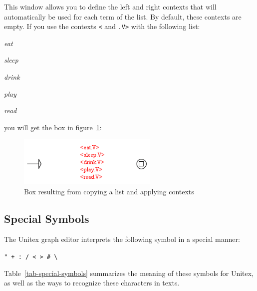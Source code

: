 \noindent This window allows you to define the left and right contexts that will
automatically be used for each term of the list. By default, these contexts are
empty. If you use the contexts  \verb+<+ and \verb+.V>+ with the following list:

\bigskip
\textit{eat}

\textit{sleep}

\textit{drink}

\textit{play}

\textit{read}

\bigskip
\noindent you will get the box in figure~\ref{fig-multiple-copy}:

\bigskip
\begin{figure}[h]
\begin{center}
\includegraphics[width=6.7cm]{resources/img/fig5-19.png}
\caption{Box resulting from copying a list and applying contexts\label{fig-multiple-copy}}
\end{center}
\end{figure}

\subsection{Special Symbols}
\noindent The Unitex graph editor interprets the following symbol in a special manner:

\bigskip
\verb," + : / < > # \,

\bigskip
\noindent Table~\ref{tab-special-symbols} summarizes the meaning of
these symbols for Unitex, as well as the ways to recognize these characters in texts.

